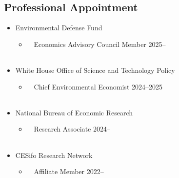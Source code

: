 \documentclass[11pt]{res} %
\begin{document}
\begin{resume}
\subsection{Professional Appointment}
	\begin{itemize} \itemsep -12pt
		\item[] Environmental Defense Fund
		\vspace{-0.05in} 
		\begin{itemize}
			\item[] \,\,\,\, Economics Advisory Council Member \hfill 2025-- \\\
		\end{itemize}
		\vspace{-0.05in}
		\item[] White House Office of Science and Technology Policy
		\vspace{-0.05in} 
		\begin{itemize}
			\item[] \,\,\,\, Chief Environmental Economist \hfill 2024--2025\\\
		\end{itemize}
		\vspace{-0.05in}
		\item[] National Bureau of Economic Research 
		\vspace{-0.05in} 
		\begin{itemize}
			\item[] \,\,\,\, Research Associate \hfill 2024--\\\
		\end{itemize}
		\vspace{-0.05in}
		\item[] CESifo Research Network 
		\vspace{-0.05in} 
		\begin{itemize}
			\item[] \,\,\,\, Affiliate Member \hfill 2022--\\\
		\end{itemize}
	\end{itemize}
\vspace{-0.5in}



\end{resume}
\end{document}
